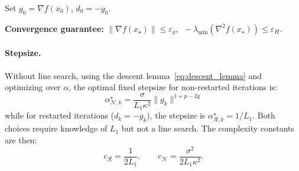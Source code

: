 \documentclass{article}
\begin{document}
\begin{algorithm}[H]
\caption{Hybrid NCG + Negative Curvature Descent}
\label{algo:hybrid}
\KwIn{$x_0 \in \mathbb{R}^n$, $\sigma \in (0,1]$, $\kappa \geq 1$, $p \geq 0$, $q \geq 0$, $\varepsilon_g > 0$, $\varepsilon_H > 0$.}

\BlankLine
Set $g_0 = \nabla f(x_0)$, $d_0 = -g_0$.

\BlankLine
{}

\BlankLine
\textbf{Convergence guarantee:} $\|\nabla f(x_\star)\| \leq \varepsilon_g$, $\;-\lambda_{\min}(\nabla^2 f(x_\star)) \leq \varepsilon_H$.
\end{algorithm}

\paragraph{Stepsize.} Without line search, using the descent lemma~\eqref{eq:descent_lemma} and optimizing over $\alpha$, the optimal fixed stepsize for non-restarted iterations is:
\begin{equation}
\label{eq:stepsize}
\alpha_{\mathcal{N},k}^\star = \frac{\sigma}{L_1\kappa^2}\|g_k\|^{1+p-2q}
\end{equation}
while for restarted iterations ($d_k = -g_k$), the stepsize is $\alpha_{\mathcal{R},k}^\star = 1/L_1$. Both choices require knowledge of $L_1$ but not a line search. The complexity constants are then:
\begin{equation}
\label{eq:constants}
c_{\mathcal{R}} = \frac{1}{2L_1}, \qquad c_{\mathcal{N}} = \frac{\sigma^2}{2L_1\kappa^2}.
\end{equation}
\end{document}
